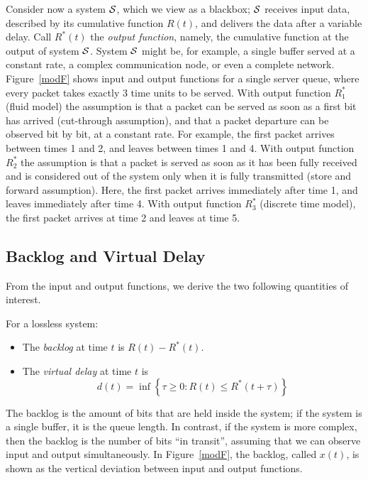 Consider now a system $\mathcal S$, which we view as a blackbox;
$\mathcal S$ receives input data, described by its cumulative function
$R(t)$, and delivers the data after a variable delay. Call
$R^{*}(t)$ the \emph{output function}, namely, the cumulative
function at the output of system $\mathcal S$. System $\mathcal S$ might be,
for example, a single buffer served at a constant rate, a complex
communication node, or even a complete network. Figure~\ref{modF}
shows input and output functions for a single server queue, where
every packet takes exactly 3 time units to be served. With output
function $R^*_1$ (fluid model) the assumption is that a packet can
be served as soon as a first bit has arrived (cut-through
assumption), and that a packet departure can be observed bit by
bit, at a constant rate. For example, the first packet arrives
between times 1 and 2, and leaves between times 1 and 4. With
output function $R^*_2$ the assumption is that a packet is served
as soon as it has been fully received and is considered out of the
system only when it is fully transmitted (store and forward
assumption). Here, the first packet arrives immediately after time
1, and leaves immediately after time 4. With output function
$R^*_3$ (discrete time model), the first packet arrives at time 2
and leaves at time 5.

\subsection{Backlog and Virtual Delay}
\label{sec-vd}
From the input and output functions, we derive the two following
quantities of interest.
\begin{definition}
 For a lossless system:
\begin{itemize}
        \item  The \emph{backlog} at time $t$ is $R(t) - R^{*}(t)$.
        \item  The \emph{virtual delay} at time $t$ is
        $$d(t) = \inf \left\{
               \tau \geq 0 : R(t) \leq R^*(t + \tau)
              \right\}
    $$
\end{itemize}
\end{definition}

The backlog is the amount of bits that are held inside the system;
if the system is a single buffer, it is the queue length. In
contrast, if the system is more complex, then the backlog is the
number of bits ``in transit'', assuming that we can observe input
and output simultaneously.  %
In
Figure~\ref{modF}, the backlog, called $x(t)$, is shown as the
vertical deviation between input and output functions.

